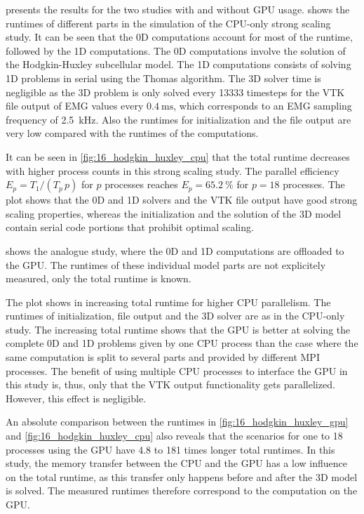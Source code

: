  presents the results for the two studies with and without GPU usage.  shows the runtimes of different parts in the simulation of the CPU-only strong scaling study. It can be seen that the 0D computations account for most of the runtime, followed by the 1D computations. The 0D computations involve the solution of the Hodgkin-Huxley subcellular model. The 1D computations consists of solving 1D problems in serial using the Thomas algorithm. The 3D solver time is negligible as the 3D problem is only solved every \num{13333} timesteps for the VTK file output of EMG values every $\SI{0.4}{\ms}$, which corresponds to an EMG sampling frequency of \SI{2.5}{\kilo\hertz}.
Also the runtimes for initialization and the file output are very low compared with the runtimes of the computations.

It can be seen in \cref{fig:16_hodgkin_huxley_cpu} that the total runtime decreases with higher process counts in this strong scaling study. The parallel efficiency $E_p = T_1/(T_p\,p)$ for $p$ processes reaches $E_p=\SI{65.2}{\percent}$ for $p=18$ processes. The plot shows that the 0D and 1D solvers and the VTK file output have good strong scaling properties, whereas the initialization and the solution of the 3D model contain serial code portions that prohibit optimal scaling.

 shows the analogue study, where the 0D and 1D computations are offloaded to the GPU. The runtimes of these individual model parts are not explicitely measured, only the total runtime is known.

The plot shows in increasing total runtime for higher CPU parallelism. 
The runtimes of initialization, file output and the 3D solver are as in the CPU-only study.
The increasing total runtime shows that the GPU is better at solving the complete 0D and 1D problems given by one CPU process than the case where the same computation is split to several parts and provided by different MPI processes. The benefit of using multiple CPU processes to interface the GPU in this study is, thus, only that the VTK output functionality gets parallelized. However, this effect is negligible.

An absolute comparison between the runtimes in \cref{fig:16_hodgkin_huxley_gpu} and \cref{fig:16_hodgkin_huxley_cpu} also reveals that the scenarios for one to 18 processes using the GPU have 4.8 to 181 times longer total runtimes. In this study, the memory transfer between the CPU and the GPU has a low influence on the total runtime, as this transfer only happens before and after the 3D model is solved. The measured runtimes therefore correspond to the computation on the GPU.

